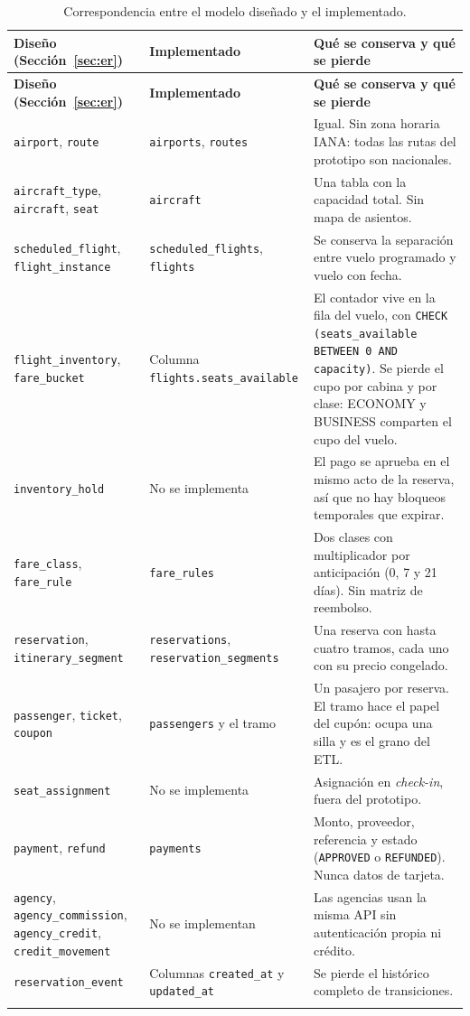 \documentclass[10pt,letterpaper]{article}
\begin{document}
\begin{longtable}{@{}L{4.4cm} L{4.0cm} L{7.2cm}@{}}
\toprule \textbf{Diseño (Sección~\ref{sec:er})} & \textbf{Implementado} & \textbf{Qué se conserva y qué se pierde} \\ \midrule \endfirsthead
\toprule \textbf{Diseño (Sección~\ref{sec:er})} & \textbf{Implementado} & \textbf{Qué se conserva y qué se pierde} \\ \midrule \endhead
\texttt{airport}, \texttt{route} & \texttt{airports}, \texttt{routes} & Igual. Sin zona horaria IANA: todas las rutas del prototipo son nacionales. \\
\texttt{aircraft\_type}, \texttt{aircraft}, \texttt{seat} & \texttt{aircraft} & Una tabla con la capacidad total. Sin mapa de asientos. \\
\texttt{scheduled\_flight}, \texttt{flight\_instance} & \texttt{scheduled\_flights}, \texttt{flights} & Se conserva la separación entre vuelo programado y vuelo con fecha. \\
\texttt{flight\_inventory}, \texttt{fare\_bucket} & Columna \texttt{flights.seats\_available} & El contador vive en la fila del vuelo, con \texttt{CHECK (seats\_available BETWEEN 0 AND capacity)}. Se pierde el cupo por cabina y por clase: ECONOMY y BUSINESS comparten el cupo del vuelo. \\
\texttt{inventory\_hold} & No se implementa & El pago se aprueba en el mismo acto de la reserva, así que no hay bloqueos temporales que expirar. \\
\texttt{fare\_class}, \texttt{fare\_rule} & \texttt{fare\_rules} & Dos clases con multiplicador por anticipación (0, 7 y 21 días). Sin matriz de reembolso. \\
\texttt{reservation}, \texttt{itinerary\_segment} & \texttt{reservations}, \texttt{reservation\_segments} & Una reserva con hasta cuatro tramos, cada uno con su precio congelado. \\
\texttt{passenger}, \texttt{ticket}, \texttt{coupon} & \texttt{passengers} y el tramo & Un pasajero por reserva. El tramo hace el papel del cupón: ocupa una silla y es el grano del ETL. \\
\texttt{seat\_assignment} & No se implementa & Asignación en \emph{check-in}, fuera del prototipo. \\
\texttt{payment}, \texttt{refund} & \texttt{payments} & Monto, proveedor, referencia y estado (\texttt{APPROVED} o \texttt{REFUNDED}). Nunca datos de tarjeta. \\
\texttt{agency}, \texttt{agency\_commission}, \texttt{agency\_credit}, \texttt{credit\_movement} & No se implementan & Las agencias usan la misma API sin autenticación propia ni crédito. \\
\texttt{reservation\_event} & Columnas \texttt{created\_at} y \texttt{updated\_at} & Se pierde el histórico completo de transiciones. \\
\bottomrule
\caption{Correspondencia entre el modelo diseñado y el implementado.}
\end{longtable}
\end{document}
